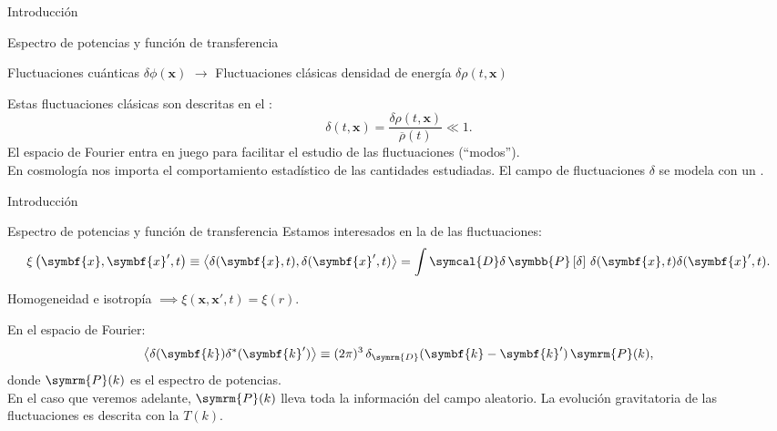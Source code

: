 \begin{frame}{Introducción}
    \begin{block}{Espectro de potencias y función de transferencia}
        \begin{center}
            Fluctuaciones cuánticas \(\delta\phi(\symbf{x})\) \(\longrightarrow\) Fluctuaciones clásicas densidad de energía \(\delta\rho(t,\symbf{x})\)
        \end{center}
        Estas fluctuaciones clásicas son descritas en el :
        \begin{equation*}
            \delta(t,\symbf{x})=\frac{\delta\rho(t,\symbf{x})}{\overbar{\rho}(t)}\ll 1.
        \end{equation*}
        El espacio de Fourier entra en juego para facilitar el estudio de las fluctuaciones (``modos'').\\
        En cosmología nos importa el comportamiento estadístico de las cantidades estudiadas. El campo de fluctuaciones \(\delta\) se modela con un .
    \end{block}
\end{frame}
\begin{frame}{Introducción}
    \begin{block}{Espectro de potencias y función de transferencia}
        Estamos interesados en la  de las fluctuaciones:
        \begin{equation*}
            \xi\left(\symbf{x},\symbf{x}',t\right)\equiv\left\langle\delta(\symbf{x},t),\delta(\symbf{x}',t)\right\rangle=\int\symcal{D}\delta\,\symbb{P}\left[\delta\right]\,\delta(\symbf{x},t)\delta(\symbf{x}',t).
        \end{equation*}
        \begin{center}
            Homogeneidad e isotropía \(\implies\xi\left(\symbf{x},\symbf{x}',t\right)=\xi(r)\).
        \end{center}
        En el espacio de Fourier:
        \begin{equation*}
            \left\langle\delta(\symbf{k})\delta^{*}(\symbf{k}')\right\rangle\equiv (2\pi)^3\,\delta_{\symrm{D}}(\symbf{k}-\symbf{k}')\,\symrm{P}(k),
        \end{equation*}
        donde \(\symrm{P}(k)\) es el espectro de potencias.\\[.3cm]
        En el caso que veremos adelante, \(\symrm{P}(k)\) lleva toda la información del campo aleatorio. La evolución gravitatoria de las fluctuaciones es descrita con la  \(T(k)\).
    \end{block}
\end{frame}
